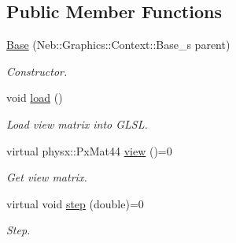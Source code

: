 \subsection*{\-Public \-Member \-Functions}
\begin{DoxyCompactItemize}
\item 
\hypertarget{classNeb_1_1Graphics_1_1Camera_1_1View_1_1Base_a6257501e2b2e014e189e3844825e296c}{\hyperlink{classNeb_1_1Graphics_1_1Camera_1_1View_1_1Base_a6257501e2b2e014e189e3844825e296c}{\-Base} (\-Neb\-::\-Graphics\-::\-Context\-::\-Base\-\_\-s parent)}\label{classNeb_1_1Graphics_1_1Camera_1_1View_1_1Base_a6257501e2b2e014e189e3844825e296c}

\begin{DoxyCompactList}\small\item\em \-Constructor. \end{DoxyCompactList}\item 
\hypertarget{classNeb_1_1Graphics_1_1Camera_1_1View_1_1Base_a24e4c9b3ec33ea7566604a54e2c202fa}{void \hyperlink{classNeb_1_1Graphics_1_1Camera_1_1View_1_1Base_a24e4c9b3ec33ea7566604a54e2c202fa}{load} ()}\label{classNeb_1_1Graphics_1_1Camera_1_1View_1_1Base_a24e4c9b3ec33ea7566604a54e2c202fa}

\begin{DoxyCompactList}\small\item\em \-Load view matrix into \-G\-L\-S\-L. \end{DoxyCompactList}\item 
\hypertarget{classNeb_1_1Graphics_1_1Camera_1_1View_1_1Base_a444b29f365cc214a6e8cb98c3bb77faa}{virtual physx\-::\-Px\-Mat44 \hyperlink{classNeb_1_1Graphics_1_1Camera_1_1View_1_1Base_a444b29f365cc214a6e8cb98c3bb77faa}{view} ()=0}\label{classNeb_1_1Graphics_1_1Camera_1_1View_1_1Base_a444b29f365cc214a6e8cb98c3bb77faa}

\begin{DoxyCompactList}\small\item\em \-Get view matrix. \end{DoxyCompactList}\item 
virtual void \hyperlink{classNeb_1_1Graphics_1_1Camera_1_1View_1_1Base_a90b789b94d88db1e913f3c4933ea41d4}{step} (double)=0
\begin{DoxyCompactList}\small\item\em \-Step. \end{DoxyCompactList}\end{DoxyCompactItemize}

